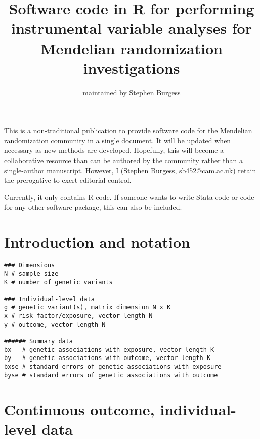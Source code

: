 \documentclass[a4paper,12pt]{article} %
\begin{document}
\title{Software code in R for performing instrumental variable analyses for Mendelian randomization investigations}
\author{maintained by Stephen Burgess}
\maketitle
This is a non-traditional publication to provide software code for the Mendelian randomization community in a single document. It will be updated when necessary as new methods are developed. Hopefully, this will become a collaborative resource than can be authored by the community rather than a single-author manuscript. However, I (Stephen Burgess, sb452@cam.ac.uk) retain the prerogative to exert editorial control.

Currently, it only contains R code. If someone wants to write Stata code or code for any other software package, this can also be included.

\clearpage

\tableofcontents %

\clearpage

\section{Introduction and notation}
\begin{lstlisting}
### Dimensions
N # sample size
K # number of genetic variants

### Individual-level data
g # genetic variant(s), matrix dimension N x K
x # risk factor/exposure, vector length N
y # outcome, vector length N

###### Summary data
bx   # genetic associations with exposure, vector length K
by   # genetic associations with outcome, vector length K
bxse # standard errors of genetic associations with exposure
byse # standard errors of genetic associations with outcome
\end{lstlisting}

\clearpage

\section{Continuous outcome, individual-level data}
\end{document}
